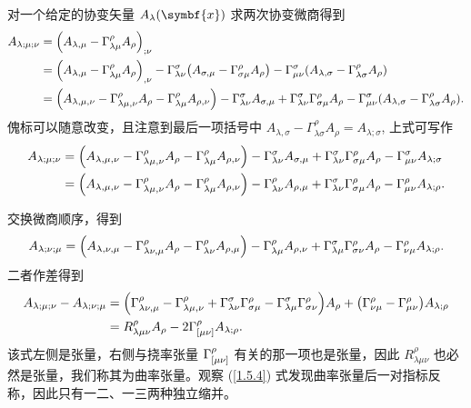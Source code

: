 \documentclass[UTF8, 12pt, a4paper, oneside, onecolumn, fontset=none]{ctexart}
\begin{document}
对一个给定的协变矢量 $A_{\lambda}\mleft(\symbf{x}\mright)$ 求两次协变微商得到
\begin{align}
A_{\lambda;\mu;\nu}&=\mleft(A_{\lambda,\mu}-\Gamma_{\lambda\mu}^{\rho}A_{\rho}\mright)_{;\nu}\notag\\
&=\mleft(A_{\lambda,\mu}-\Gamma_{\lambda\mu}^{\rho}A_{\rho}\mright)_{,\nu}-\Gamma_{\lambda\nu}^{\sigma}\mleft(A_{\sigma,\mu}-\Gamma_{\sigma\mu}^{\rho}A_{\rho}\mright)-\Gamma_{\mu\nu}^{\sigma}\mleft(A_{\lambda,\sigma}-\Gamma_{\lambda\sigma}^{\rho}A_{\rho}\mright)\notag\\
&=\mleft(A_{\lambda,\mu,\nu}-\Gamma_{\lambda\mu,\nu}^{\rho}A_{\rho}-\Gamma_{\lambda\mu}^{\rho}A_{\rho,\nu}\mright)-\Gamma_{\lambda\nu}^{\sigma}A_{\sigma,\mu}+\Gamma_{\lambda\nu}^{\sigma}\Gamma_{\sigma\mu}^{\rho}A_{\rho}-\Gamma_{\mu\nu}^{\sigma}\mleft(A_{\lambda,\sigma}-\Gamma_{\lambda\sigma}^{\rho}A_{\rho}\mright).
\end{align}
傀标可以随意改变，且注意到最后一项括号中 $A_{\lambda,\sigma}-\Gamma_{\lambda\sigma}^{\rho}A_{\rho}=A_{\lambda;\sigma}$, 上式可写作
\begin{align}
A_{\lambda;\mu;\nu}&=\mleft(A_{\lambda,\mu,\nu}-\Gamma_{\lambda\mu,\nu}^{\rho}A_{\rho}-\Gamma_{\lambda\mu}^{\rho}A_{\rho,\nu}\mright)-\Gamma_{\lambda\nu}^{\sigma}A_{\sigma,\mu}+\Gamma_{\lambda\nu}^{\sigma}\Gamma_{\sigma\mu}^{\rho}A_{\rho}-\Gamma_{\mu\nu}^{\sigma}A_{\lambda;\sigma}\notag\\
&=\mleft(A_{\lambda,\mu,\nu}-\Gamma_{\lambda\mu,\nu}^{\rho}A_{\rho}-\Gamma_{\lambda\mu}^{\rho}A_{\rho,\nu}\mright)-\Gamma_{\lambda\nu}^{\rho}A_{\rho,\mu}+\Gamma_{\lambda\nu}^{\sigma}\Gamma_{\sigma\mu}^{\rho}A_{\rho}-\Gamma_{\mu\nu}^{\rho}A_{\lambda;\rho}.
\end{align}

交换微商顺序，得到
\begin{equation}
A_{\lambda;\nu;\mu}=\mleft(A_{\lambda,\nu,\mu}-\Gamma_{\lambda\nu,\mu}^{\rho}A_{\rho}-\Gamma_{\lambda\nu}^{\rho}A_{\rho,\mu}\mright)-\Gamma_{\lambda\mu}^{\rho}A_{\rho,\nu}+\Gamma_{\lambda\mu}^{\sigma}\Gamma_{\sigma\nu}^{\rho}A_{\rho}-\Gamma_{\nu\mu}^{\rho}A_{\lambda;\rho}.
\end{equation}
二者作差得到
\begin{align}
A_{\lambda;\mu;\nu}-A_{\lambda;\nu;\mu}&=\mleft(\Gamma_{\lambda\nu,\mu}^{\rho}-\Gamma_{\lambda\mu,\nu}^{\rho}+\Gamma_{\lambda\nu}^{\sigma}\Gamma_{\sigma\mu}^{\rho}-\Gamma_{\lambda\mu}^{\sigma}\Gamma_{\sigma\nu}^{\rho}\mright) A_{\rho}+\mleft(\Gamma_{\nu\mu}^{\rho}-\Gamma_{\mu\nu}^{\rho}\mright) A_{\lambda;\rho}\notag\\
&=R_{\lambda\mu\nu}^{\rho}A_{\rho}-2\Gamma^{\rho}_{\mleft[\mu\nu\mright]}A_{\lambda;\rho}.\label{1.5.4}
\end{align}
该式左侧是张量，右侧与挠率张量 $\Gamma^{\rho}_{\mleft[\mu\nu\mright]}$ 有关的那一项也是张量，因此 $R_{\lambda\mu\nu}^{\rho}$ 也必然是张量，我们称其为曲率张量。观察 (\ref{1.5.4}) 式发现曲率张量后一对指标反称，因此只有一二、一三两种独立缩并。
\end{document}
